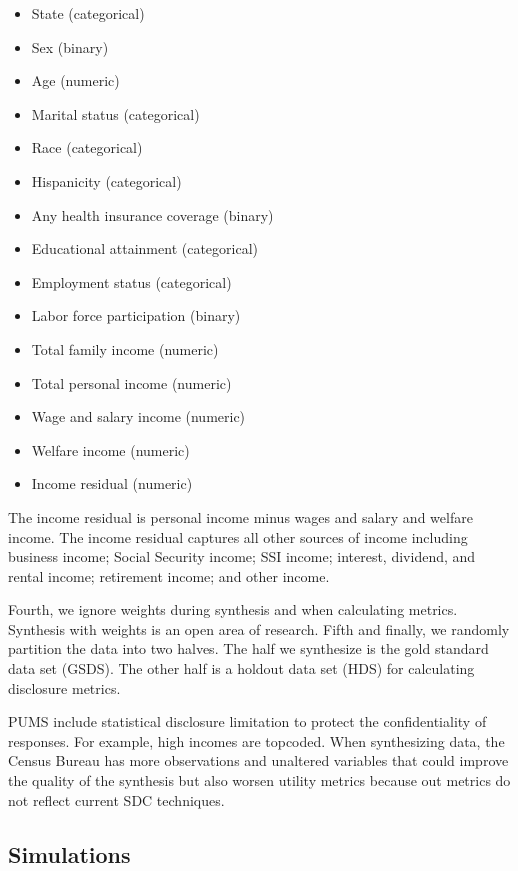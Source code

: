 \documentclass[
]{urban-formatting}
\providecommand{\tightlist}{%
  \setlength{\itemsep}{0pt}\setlength{\parskip}{0pt}}\usepackage{longtable,booktabs,array}
\begin{document}
\begin{itemize}
\tightlist
\item
  State (categorical)
\item
  Sex (binary)
\item
  Age (numeric)
\item
  Marital status (categorical)
\item
  Race (categorical)
\item
  Hispanicity (categorical)
\item
  Any health insurance coverage (binary)
\item
  Educational attainment (categorical)
\item
  Employment status (categorical)
\item
  Labor force participation (binary)
\item
  Total family income (numeric)
\item
  Total personal income (numeric)
\item
  Wage and salary income (numeric)
\item
  Welfare income (numeric)
\item
  Income residual (numeric)
\end{itemize}

The income residual is personal income minus wages and salary and
welfare income. The income residual captures all other sources of income
including business income; Social Security income; SSI income; interest,
dividend, and rental income; retirement income; and other income.

Fourth, we ignore weights during synthesis and when calculating metrics.
Synthesis with weights is an open area of research. Fifth and finally,
we randomly partition the data into two halves. The half we synthesize
is the gold standard data set (GSDS). The other half is a holdout data
set (HDS) for calculating disclosure metrics.

PUMS include statistical disclosure limitation to protect the
confidentiality of responses. For example, high incomes are topcoded.
When synthesizing data, the Census Bureau has more observations and
unaltered variables that could improve the quality of the synthesis but
also worsen utility metrics because out metrics do not reflect current
SDC techniques.

\subsection{Simulations}
\end{document}
